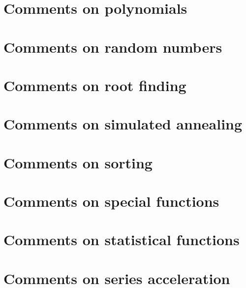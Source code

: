 \documentclass[twoside]{book}
\begin{document}
\chapter{Comments on polynomials}
\label{Comments_01on_01polynomials}
\hypertarget{Comments_01on_01polynomials}{}

\chapter{Comments on random numbers}
\label{Comments_01on_01random_01numbers}
\hypertarget{Comments_01on_01random_01numbers}{}

\chapter{Comments on root finding}
\label{Comments_01on_01root_01finding}
\hypertarget{Comments_01on_01root_01finding}{}

\chapter{Comments on simulated annealing}
\label{Comments_01on_01simulated_01annealing}
\hypertarget{Comments_01on_01simulated_01annealing}{}

\chapter{Comments on sorting}
\label{Comments_01on_01sorting}
\hypertarget{Comments_01on_01sorting}{}

\chapter{Comments on special functions}
\label{Comments_01on_01special_01functions}
\hypertarget{Comments_01on_01special_01functions}{}

\chapter{Comments on statistical functions}
\label{Comments_01on_01statistical_01functions}
\hypertarget{Comments_01on_01statistical_01functions}{}

\chapter{Comments on series acceleration}
\label{Comments_01on_01series_01acceleration}
\hypertarget{Comments_01on_01series_01acceleration}{}

\end{document}
